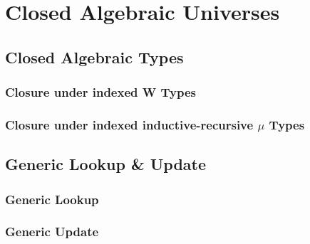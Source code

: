 \documentclass[12pt]{report}
\theoremstyle{definition}
\theoremstyle{remark}
\numberwithin{definition}{section}
\numberwithin{equation}{section}
\numberwithin{proposition}{section}
\numberwithin{conjecture}{section}
\numberwithin{theorem}{section}
\numberwithin{lemma}{section}
\numberwithin{corollary}{section}
\numberwithin{example}{section}
\numberwithin{remark}{section}
\begin{document}




\part{Closed Algebraic Universes}\label{part:closed}




\chapter{Closed Algebraic Types}\label{ch:closed}
\section{Closure under indexed W Types}
\section{Closure under indexed inductive-recursive $\mu$ Types}

\chapter{Generic Lookup \& Update}\label{ch:gupdate}
\section{Generic Lookup}
\section{Generic Update}
\end{document}
